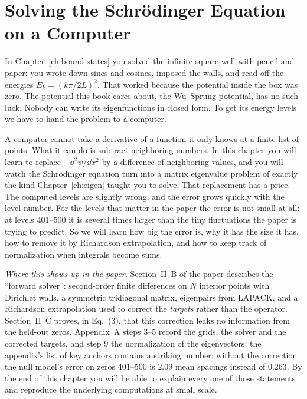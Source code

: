 \chapter{Solving the Schr\"odinger Equation on a Computer}\label{ch:finite-differences}

\begin{chapterintro}
In Chapter~\ref{ch:bound-states} you solved the infinite square well with pencil and paper: you wrote down sines and cosines, imposed the walls, and read off the energies $E_k=(k\pi/2L)^2$. That worked because the potential inside the box was zero. The potential this book cares about, the Wu--Sprung potential, has no such luck. Nobody can write its eigenfunctions in closed form. To get its energy levels we have to hand the problem to a computer.

A computer cannot take a derivative of a function it only knows at a finite list of points. What it can do is subtract neighboring numbers. In this chapter you will learn to replace $-\dd^2\psi/\dd x^2$ by a difference of neighboring values, and you will watch the Schr\"odinger equation turn into a matrix eigenvalue problem of exactly the kind Chapter~\ref{ch:eigen} taught you to solve. That replacement has a price. The computed levels are slightly wrong, and the error grows quickly with the level number. For the levels that matter in the paper the error is not small at all: at levels 401--500 it is several times larger than the tiny fluctuations the paper is trying to predict. So we will learn how big the error is, why it has the size it has, how to remove it by Richardson extrapolation, and how to keep track of normalization when integrals become sums.

\emph{Where this shows up in the paper.} Section~II~B of the paper \cite{soniR1} describes the ``forward solver'': second-order finite differences on $N$ interior points with Dirichlet walls, a symmetric tridiagonal matrix, eigenpairs from LAPACK, and a Richardson extrapolation used to correct the \emph{targets} rather than the operator. Section~II~C proves, in Eq.~(3), that this correction leaks no information from the held-out zeros. Appendix~A steps 3--5 record the grids, the solver and the corrected targets, and step 9 the normalization of the eigenvectors; the appendix's list of key anchors contains a striking number: without the correction the null model's error on zeros 401--500 is $2.09$ mean spacings instead of $0.263$. By the end of this chapter you will be able to explain every one of those statements and reproduce the underlying computations at small scale.
\end{chapterintro}

